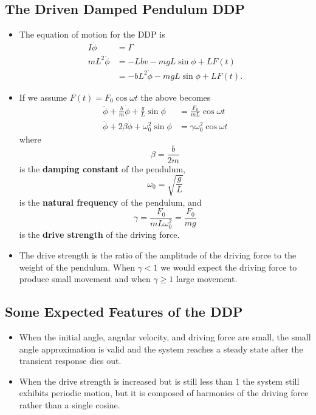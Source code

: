\documentclass{article}
\begin{document}
\subsection{The Driven Damped Pendulum DDP}

\begin{itemize}
  \item The equation of motion for the DDP is \begin{align*}
          I \ddot{\phi}     & = \Gamma                                        \\
          m L^2 \ddot{\phi} & = -L b v - m g L \sin \phi + L F(t)             \\
                            & = -b L^2 \dot{\phi} - m g L \sin \phi + L F(t).
        \end{align*}

  \item If we assume $F(t) = F_0 \cos \omega t$ the above becomes \begin{align*}
          \ddot{\phi} + \frac{b}{m} \dot{\phi} + \frac{g}{L} \sin \phi & = \frac{F_0}{m L} \cos \omega t   \\
          \ddot{\phi} + 2 \beta \dot{\phi} + \omega_0^2 \sin \phi      & = \gamma \omega_0^2 \cos \omega t
        \end{align*} where \[\beta = \frac{b}{2 m}\] is the \textbf{damping constant} of the pendulum, \[\omega_0 = \sqrt{\frac{g}{L}}\] is the \textbf{natural frequency} of the pendulum, and \[\gamma = \frac{F_0}{m L \omega_0^2} = \frac{F_0}{m g}\] is the \textbf{drive strength} of the driving force.

  \item The drive strength is the ratio of the amplitude of the driving force to the weight of the pendulum. When $\gamma < 1$ we would expect the driving force to produce small movement and when $\gamma \ge 1$ large movement.
\end{itemize}

\subsection{Some Expected Features of the DDP}

\begin{itemize}
  \item When the initial angle, angular velocity, and driving force are small, the small angle approximation is valid and the system reaches a steady state after the transient response dies out.

  \item When the drive strength is increased but is still less than $1$ the system still exhibits periodic motion, but it is composed of harmonics of the driving force rather than a single cosine.
\end{itemize}
\end{document}
